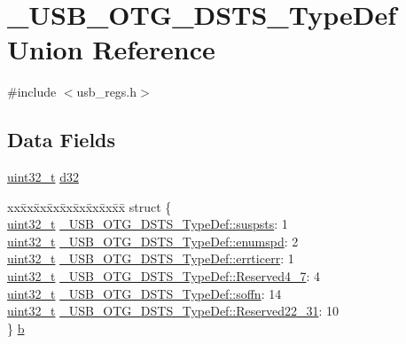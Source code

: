 \hypertarget{union___u_s_b___o_t_g___d_s_t_s___type_def}{\section{\-\_\-\-U\-S\-B\-\_\-\-O\-T\-G\-\_\-\-D\-S\-T\-S\-\_\-\-Type\-Def Union Reference}
\label{union___u_s_b___o_t_g___d_s_t_s___type_def}
}


{\ttfamily \#include $<$usb\-\_\-regs.\-h$>$}

\subsection*{Data Fields}
\begin{DoxyCompactItemize}
\item 
\hyperlink{stdint_8h_a435d1572bf3f880d55459d9805097f62}{uint32\-\_\-t} \hyperlink{group___u_s_b___o_t_g___d_r_i_v_e_r_ga737954fcf78fc0cf776ed36505e4b082}{d32}
\item 
\begin{tabbing}
xx\=xx\=xx\=xx\=xx\=xx\=xx\=xx\=xx\=\kill
struct \{\\
\>\hyperlink{stdint_8h_a435d1572bf3f880d55459d9805097f62}{uint32\_t} \hyperlink{group___u_s_b___o_t_g___d_r_i_v_e_r_ga0b1f01a9acba3c6227e95efe0b677faa}{\_USB\_OTG\_DSTS\_TypeDef::suspsts}: 1\\
\>\hyperlink{stdint_8h_a435d1572bf3f880d55459d9805097f62}{uint32\_t} \hyperlink{group___u_s_b___o_t_g___d_r_i_v_e_r_gae7ed8264debc9dd05d3933b3e4b05216}{\_USB\_OTG\_DSTS\_TypeDef::enumspd}: 2\\
\>\hyperlink{stdint_8h_a435d1572bf3f880d55459d9805097f62}{uint32\_t} \hyperlink{group___u_s_b___o_t_g___d_r_i_v_e_r_ga1b4282c2381173d21b6fea82cb38f5b0}{\_USB\_OTG\_DSTS\_TypeDef::errticerr}: 1\\
\>\hyperlink{stdint_8h_a435d1572bf3f880d55459d9805097f62}{uint32\_t} \hyperlink{group___u_s_b___o_t_g___d_r_i_v_e_r_gae8553a9ded2154d81ebcdd5e005839ac}{\_USB\_OTG\_DSTS\_TypeDef::Reserved4\_7}: 4\\
\>\hyperlink{stdint_8h_a435d1572bf3f880d55459d9805097f62}{uint32\_t} \hyperlink{group___u_s_b___o_t_g___d_r_i_v_e_r_ga5416ffe4780ad95cc3dfb9bee8549ab8}{\_USB\_OTG\_DSTS\_TypeDef::soffn}: 14\\
\>\hyperlink{stdint_8h_a435d1572bf3f880d55459d9805097f62}{uint32\_t} \hyperlink{group___u_s_b___o_t_g___d_r_i_v_e_r_ga021644a5a39c1bdab5a7d0df8ea058be}{\_USB\_OTG\_DSTS\_TypeDef::Reserved22\_31}: 10\\
\} \hyperlink{group___u_s_b___o_t_g___d_r_i_v_e_r_ga6ec86fc2daca53454a5e3ab54dd322d9}{b}\\

\end{tabbing}\end{DoxyCompactItemize}


